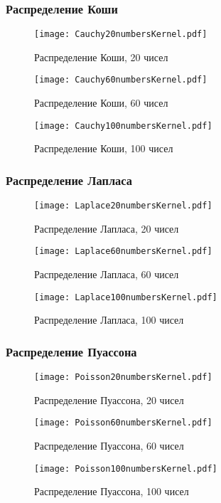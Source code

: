 \documentclass[a4paper,12pt]{article} %
\begin{document}
\subsubsection{Распределение Коши}
\begin{figure}[H]
    \centering
    \texttt{[image: Cauchy20numbersKernel.pdf]}
    \caption{Распределение Коши, 20 чисел}
    \label{fig:koshiKer20}
\end{figure}
\begin{figure}[H]
    \centering
    \texttt{[image: Cauchy60numbersKernel.pdf]}
    \caption{Распределение Коши, 60 чисел}
    \label{fig:koshiKer60}
\end{figure}
\begin{figure}[H]
    \centering
    \texttt{[image: Cauchy100numbersKernel.pdf]}
    \caption{Распределение Коши, 100 чисел}
    \label{fig:koshiKer100}
\end{figure}
\subsubsection{Распределение Лапласа}
\begin{figure}[H]
    \centering
    \texttt{[image: Laplace20numbersKernel.pdf]}
    \caption{Распределение Лапласа, 20 чисел}
    \label{fig:laplaceKer20}
\end{figure}
\begin{figure}[H]
    \centering
    \texttt{[image: Laplace60numbersKernel.pdf]}
    \caption{Распределение Лапласа, 60 чисел}
    \label{fig:laplaceKer60}
\end{figure}
\begin{figure}[H]
    \centering
    \texttt{[image: Laplace100numbersKernel.pdf]}
    \caption{Распределение Лапласа, 100 чисел}
    \label{fig:laplaceKer100}
\end{figure}
\subsubsection{Распределение Пуассона}
\begin{figure}[H]
    \centering
    \texttt{[image: Poisson20numbersKernel.pdf]}
    \caption{Распределение Пуассона, 20 чисел}
    \label{fig:poissonKer20}
\end{figure}
\begin{figure}[H]
    \centering
    \texttt{[image: Poisson60numbersKernel.pdf]}
    \caption{Распределение Пуассона, 60 чисел}
    \label{fig:poissonKer60}
\end{figure}
\begin{figure}[H]
    \centering
    \texttt{[image: Poisson100numbersKernel.pdf]}
    \caption{Распределение Пуассона, 100 чисел}
    \label{fig:poissonKer100}
\end{figure}
\end{document}
